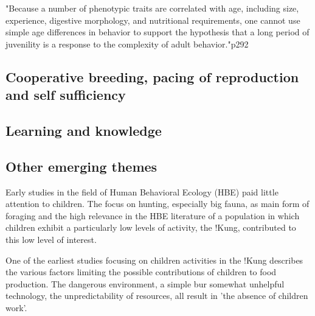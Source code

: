 \cite{bird_children_2002} "Because a number of phenotypic traits are correlated with age, including size, experience, digestive morphology, and nutritional requirements, one cannot use simple age differences in behavior to support the hypothesis that a long period of juvenility is a response to the complexity of adult behavior."p292


\subsection{Cooperative breeding, pacing of reproduction and self sufficiency}

\subsection{Learning and knowledge}

\subsection{Other emerging themes}



Early studies in the field of Human Behavioral Ecology (HBE) paid little attention to children. The focus on hunting, especially big fauna, as main form of foraging and the high relevance in the HBE literature of a population in which children exhibit a particularly low levels of activity, the !Kung, contributed to this low level of interest. 

One of the earliest studies focusing on children activities in the !Kung \cite{lee_social_1976} describes the various factors limiting the possible contributions of children to food production. The dangerous environment, a simple bur somewhat unhelpful technology, the unpredictability of resources, all result in 'the absence of children work'.
